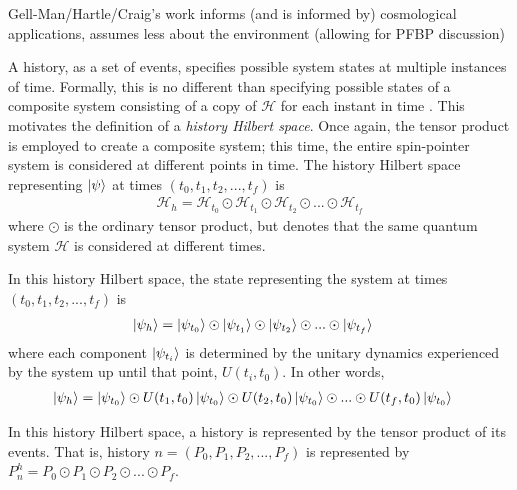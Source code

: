 %
%


Gell-Man/Hartle/Craig's work informs (and is informed by) cosmological applications, assumes less about the environment (allowing for PFBP discussion)

A history, as a set of events, specifies possible system states at multiple instances of time. Formally, this is no different than specifying possible states of a composite system consisting of a copy of $\mathcal{H}$ for each instant in time \cite{Griffiths}. This motivates the definition of a \textit{history Hilbert space}. Once again, the tensor product is employed to create a composite system; this time, the entire spin-pointer system is considered at different points in time. The history Hilbert space representing $\ket{\psi}$ at times $\left(t_0, t_1, t_2, ..., t_f \right)$ is
\begin{align}
  {\mathcal{H}}_h = \mathcal{H}_{t_0} \odot \mathcal{H}_{t_1} \odot \mathcal{H}_{t_2} \odot ... \odot \mathcal{H}_{t_f}
\end{align}
where $\odot$ is the ordinary tensor product, but denotes that the same quantum system $\mathcal{H}$ is considered at different times.

In this history Hilbert space, the state representing the system at times $\left(t_0, t_1, t_2, ..., t_f \right)$ is
\begin{align}
  \ket{\psi_h} &= \ket{\psi_{t_0}} \odot \ket{\psi_{t_1}} \odot \ket{\psi_{t_2}} \odot ... \odot \ket{\psi_{t_f}}
\end{align}
where each component $\ket{\psi_{t_i}}$ is determined by the unitary dynamics experienced by the system up until that point, $U(t_i, t_0)$. In other words,
\begin{align}
  \ket{\psi_h} &= \ket{\psi_{t_0}} \odot U(t_1, t_0)\ket{\psi_{t_0}} \odot U(t_2, t_0)\ket{\psi_{t_0}} \odot ... \odot U(t_f, t_0)\ket{\psi_{t_0}}
\end{align}

In this history Hilbert space, a history is represented by the tensor product of its events. That is, history $n = \left( P_0, P_1, P_2, ... , P_f \right)$ is represented by $P^h_n = P_0 \odot P_1 \odot P_2 \odot ... \odot P_f $.

